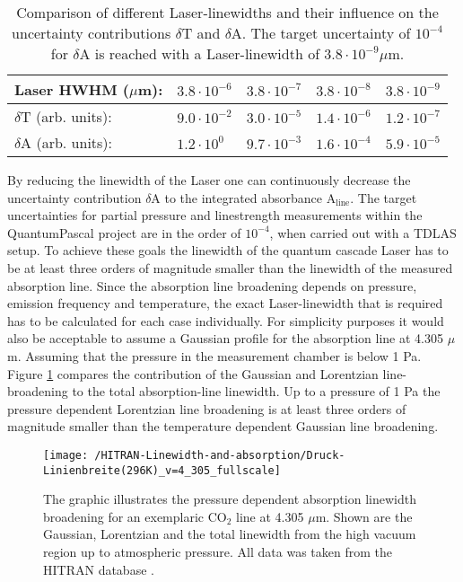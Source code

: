 \begin{table}
	\begin{center}
		\begin{tabular}{ lllll }
			\toprule
			Laser HWHM ($\mu$m): & $3.8 \cdot 10^{-6}$ & $3.8 \cdot 10^{-7}$ & $3.8 \cdot 10^{-8}$  & $3.8 \cdot 10^{-9}$ \\
			\midrule
			$\delta$T (arb. units): & $9.0 \cdot 10^{-2}$& $3.0 \cdot 10^{-5}$& $1.4 \cdot 10^{-6}$ &  $1.2 \cdot 10^{-7}$\\
			$\delta$A (arb. units): &$1.2 \cdot 10^{0}$&$9.7 \cdot 10^{-3}$&$1.6 \cdot 10^{-4}$&$5.9 \cdot 10^{-5}$\\
			\bottomrule
		\end{tabular}
	\end{center}
	\caption{Comparison of different Laser-linewidths and their influence on the uncertainty contributions $\delta$T and $\delta$A. The target uncertainty of $10^{-4}$ for $\delta$A is reached with a Laser-linewidth of $3.8 \cdot 10^{-9}\mu$m.}
	\label{Laser_HWHM_table}
\end{table}
\noindent
By reducing the linewidth of the Laser one can  continuously decrease the uncertainty contribution $\delta$A to the integrated absorbance A$_{\text{line}}$. The target uncertainties for partial pressure and linestrength measurements within the QuantumPascal project are in the order of $10^{-4}$, when carried out with a TDLAS setup. To achieve these goals the linewidth of the quantum cascade Laser has to be at least three orders of magnitude smaller than the linewidth of the measured absorption line. Since the absorption line broadening depends on pressure, emission frequency and temperature, the exact Laser-linewidth that is required has to be calculated for each case individually. For simplicity purposes it would also be acceptable to assume a Gaussian profile for the absorption line at 4.305 $\mu$m. Assuming that the pressure in the measurement chamber is below 1 Pa. Figure \ref{C02_pressuredependant_linewidth} compares the contribution of the Gaussian and Lorentzian line-broadening to the total absorption-line linewidth. Up to a pressure of 1 Pa the pressure dependent Lorentzian line broadening is at least three orders of magnitude smaller than the temperature dependent Gaussian line broadening.
\begin{figure}[H]
	\centering
	\texttt{[image: /HITRAN-Linewidth-and-absorption/Druck-Linienbreite(296K)\_v=4\_305\_fullscale]}
	\caption{The graphic illustrates the pressure dependent absorption linewidth broadening for an exemplaric CO$_2$ line at 4.305 $\mu$m. Shown are the Gaussian, Lorentzian and the total linewidth from the high vacuum region up to atmospheric pressure. All data was taken from the HITRAN database \cite{Hitran2012} \cite{Hitran2016}.}
	\label{C02_pressuredependant_linewidth}
\end{figure}
\newpage
